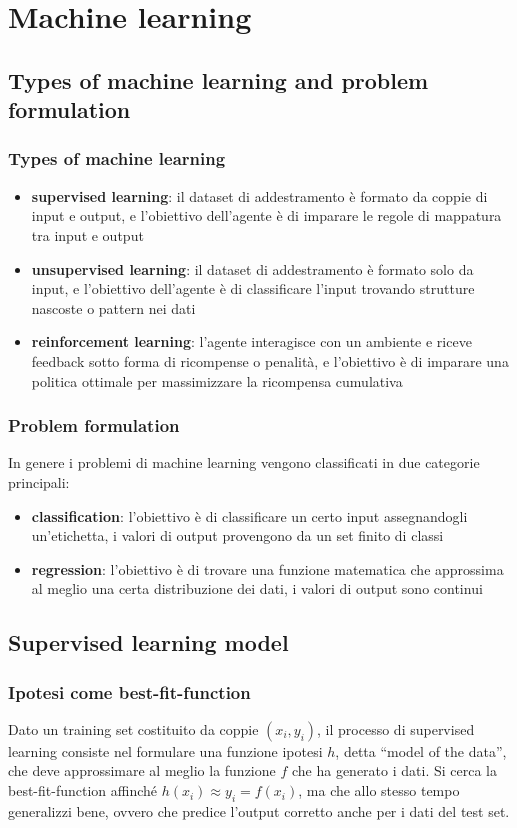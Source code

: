 \section{Machine learning}
\subsection{Types of machine learning and problem formulation}
\subsubsection*{Types of machine learning}
\begin{itemize}
	\item \textbf{supervised learning}: il dataset di addestramento è formato da coppie di input e output, e l'obiettivo
	dell'agente è di imparare le regole di mappatura tra input e output
	\item \textbf{unsupervised learning}: il dataset di addestramento è formato solo da input, e l'obiettivo dell'agente è
	di classificare l'input trovando strutture nascoste o pattern nei dati
	\item \textbf{reinforcement learning}: l'agente interagisce con un ambiente e riceve feedback sotto forma di ricompense
	o penalità, e l'obiettivo è di imparare una politica ottimale per massimizzare la ricompensa cumulativa
\end{itemize}

\subsubsection*{Problem formulation}
In genere i problemi di machine learning vengono classificati in due categorie principali:
\begin{itemize}
	\item \textbf{classification}: l'obiettivo è di classificare un certo input assegnandogli un'etichetta, i valori di
	output provengono da un set finito di classi
	\item \textbf{regression}: l'obiettivo è di trovare una funzione matematica che approssima al meglio una certa distribuzione
	dei dati, i valori di output sono continui
\end{itemize}

\subsection{Supervised learning model}
\subsubsection*{Ipotesi come best-fit-function}
Dato un training set costituito da coppie \((x_i, y_i)\), il processo di supervised learning consiste nel formulare
una funzione ipotesi \(h\), detta ``model of the data'', che deve approssimare al meglio la funzione \(f\) che ha
generato i dati. Si cerca la best-fit-function affinché \(h(x_i) \approx y_i = f(x_i)\), ma che allo stesso tempo
generalizzi bene, ovvero che predice l'output corretto anche per i dati del test set.

